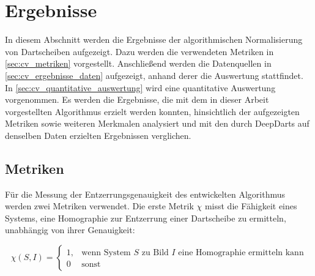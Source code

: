 
\section{Ergebnisse}
\label{sec:cv:ergebnisse}

In diesem Abschnitt werden die Ergebnisse der algorithmischen Normalisierung von Dartscheiben aufgezeigt. Dazu werden die verwendeten Metriken in \autoref{sec:cv_metriken} vorgestellt. Anschließend werden die Datenquellen in \autoref{sec:cv_ergebnisse_daten} aufgezeigt, anhand derer die Auswertung stattfindet. In \autoref{sec:cv_quantitative_auswertung} wird eine quantitative Auswertung vorgenommen. Es werden die Ergebnisse, die mit dem in dieser Arbeit vorgestellten Algorithmus erzielt werden konnten, hinsichtlich der aufgezeigten Metriken sowie weiteren Merkmalen analysiert und mit den durch DeepDarts auf denselben Daten erzielten Ergebnissen verglichen.


\subsection{Metriken}
\label{sec:cv_metriken}

Für die Messung der Entzerrungsgenauigkeit des entwickelten Algorithmus werden zwei Metriken verwendet. Die erste Metrik $\chi$ misst die Fähigkeit eines Systems, eine Homographie zur Entzerrung einer Dartscheibe zu ermitteln, unabhängig von ihrer Genauigkeit:

\begin{equation*}
    \chi(S, I) =
    \begin{cases}
        1, & \text{wenn System $S$ zu Bild $I$ eine Homographie ermitteln kann} \\
        0  & \text{sonst}
    \end{cases}
\end{equation*}

